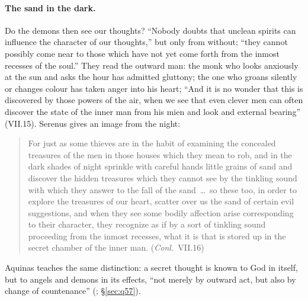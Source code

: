 \paragraph{The sand in the dark.} Do the demons then see our thoughts?
``Nobody doubts that unclean spirits can influence the character of our
thoughts,'' but only from without; ``they cannot possibly come near to
those which have not yet come forth from the inmost recesses of the
soul.'' They read the outward man: the monk who looks anxiously at the
sun and asks the hour has admitted gluttony; the one who groans silently
or changes colour has taken anger into his heart; ``And it is no wonder
that this is discovered by those powers of the air, when we see that even
clever men can often discover the state of the inner man from his mien
and look and external bearing'' (VII.15). Serenus gives an image from the
night:
\begin{quote}
For just as some thieves are in the habit of examining the concealed
treasures of the men in those houses which they mean to rob, and in the
dark shades of night sprinkle with careful hands little grains of sand
and discover the hidden treasures which they cannot see by the tinkling
sound with which they answer to the fall of the sand~\dots\ so these too,
in order to explore the treasures of our heart, scatter over us the sand
of certain evil suggestions, and when they see some bodily affection
arise corresponding to their character, they recognize as if by a sort of
tinkling sound proceeding from the inmost recesses, what it is that is
stored up in the secret chamber of the inner man. (\emph{Conl.}\ VII.16)
\end{quote}
\noindent Aquinas teaches the same distinction: a secret thought is known
to God in itself, but to angels and demons in its effects, ``not merely by
outward act, but also by change of countenance'' (;
\S\ref{sec:q57}).

